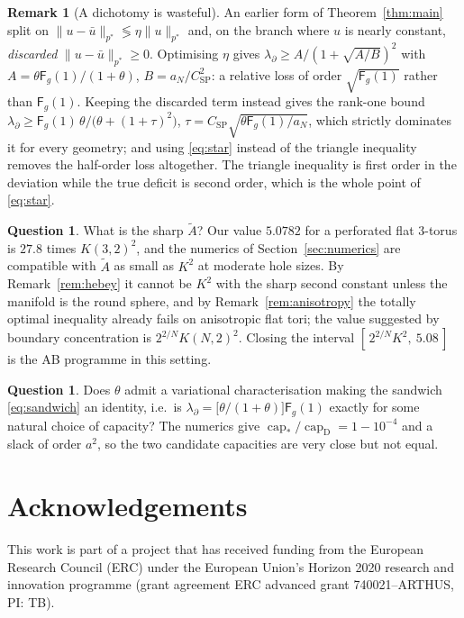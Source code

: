 \documentclass[11pt,reqno]{amsart}
\theoremstyle{plain}
\theoremstyle{definition}
\newtheorem{remark}[theorem]{Remark}
\newtheorem{question}[theorem]{Question}
\newcommand{\aN}{a_N}
\newcommand{\pstar}{p^{*}}
\newcommand{\cpstar}{\operatorname{cap}_{*}}
\newcommand{\Fq}{\mathsf{F}}
\newcommand{\Ksob}{K}
\newcommand{\Csp}{C_{\mathrm{SP}}}
\newcommand{\Atil}{\widetilde{A}}
\begin{document}
\begin{remark}[A dichotomy is wasteful]
\label{rem:dichotomy}
An earlier form of Theorem~\ref{thm:main} split on
$\|u-\bar u\|_{\pstar}\lessgtr\eta\|u\|_{\pstar}$ and, on the branch where $u$ is
nearly constant, \emph{discarded} $\|u-\bar u\|_{\pstar}\ge0$. Optimising $\eta$
gives $\lambda_\partial\ge A/(1+\sqrt{A/B})^2$ with
$A=\theta\Fq_g(1)/(1+\theta)$, $B=\aN/\Csp^2$: a relative loss of order
$\sqrt{\Fq_g(1)}$ rather than $\Fq_g(1)$. Keeping the discarded term instead gives
the rank-one bound
$\lambda_\partial\ge\Fq_g(1)\,\theta/\bigl(\theta+(1+\tau)^2\bigr)$,
$\tau=\Csp\sqrt{\theta\Fq_g(1)/\aN}$, which strictly dominates it for every
geometry; and using \eqref{eq:star} instead of the triangle inequality removes the
half-order loss altogether. The triangle inequality is first order in the
deviation while the true deficit is second order, which is the whole point of
\eqref{eq:star}.
\end{remark}

\begin{question}
What is the sharp $\Atil$? Our value $5.0782$ for a perforated flat $3$-torus is
$27.8$ times $\Ksob(3,2)^2$, and the numerics of Section~\ref{sec:numerics} are
compatible with $\Atil$ as small as $\Ksob^2$ at moderate hole sizes. By
Remark~\ref{rem:hebey} it cannot be $\Ksob^2$ with the sharp second constant unless
the manifold is the round sphere, and by Remark~\ref{rem:anisotropy} the totally
optimal inequality already fails on anisotropic flat tori; the value suggested by
boundary concentration is $2^{2/N}\Ksob(N,2)^2$. Closing the interval
$[\,2^{2/N}\Ksob^2,\ 5.08\,]$ is the AB programme in this setting.
\end{question}

\begin{question}
Does $\theta$ admit a variational characterisation making the sandwich
\eqref{eq:sandwich} an identity, i.e.\ is
$\lambda_\partial=\bigl[\theta/(1+\theta)\bigr]\Fq_g(1)$ exactly for some natural
choice of capacity? The numerics give $\cpstar/\operatorname{cap}_{\mathrm D}
=1-10^{-4}$ and a slack of order $a^2$, so the two candidate capacities are very
close but not equal.
\end{question}

\section*{Acknowledgements}
This work is part of a project that has received funding from the European
Research Council (ERC) under the European Union's Horizon 2020 research and
innovation programme (grant agreement ERC advanced grant 740021--ARTHUS, PI: TB).
\end{document}
